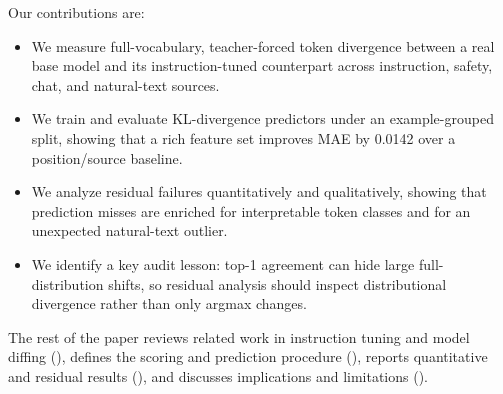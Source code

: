 Our contributions are:
\begin{itemize}
\setlength{\itemsep}{0pt}
\setlength{\topsep}{0pt}
\item We measure full-vocabulary, teacher-forced token divergence between a real base model and its instruction-tuned counterpart across instruction, safety, chat, and natural-text sources.
\item We train and evaluate KL-divergence predictors under an example-grouped split, showing that a rich feature set improves MAE by 0.0142 over a position/source baseline.
\item We analyze residual failures quantitatively and qualitatively, showing that prediction misses are enriched for interpretable token classes and for an unexpected natural-text outlier.
\item We identify a key audit lesson: top-1 agreement can hide large full-distribution shifts, so residual analysis should inspect distributional divergence rather than only argmax changes.
\end{itemize}

The rest of the paper reviews related work in instruction tuning and model diffing (), defines the scoring and prediction procedure (), reports quantitative and residual results (), and discusses implications and limitations ().
